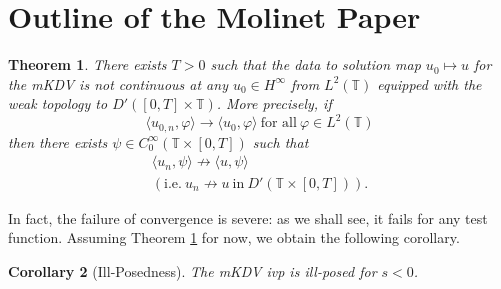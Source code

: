 \documentclass[12pt,reqno]{amsart}
\numberwithin{equation}{section}  %
\newcommand{\ci}{\mathbb{T}}
\newcommand{\vp}{\varphi}
\newtheorem{theorem}{Theorem}[section]
\newtheorem{corollary}[theorem]{Corollary}
\begin{document}
  \section{Outline of the Molinet Paper \cite{Molinet:2011uq}}
        \label{sec:outline}
        \begin{theorem}
          \label{thm:cont-fail}
        There exists $T > 0$ such that the data to solution map $u_{0} \mapsto u$ for
        the mKDV is not continuous at any $u_{0} \in H^{\infty}$ from $L^{2}(\ci)$
        equipped with the weak topology to $D'\left([0, T] \times \ci
        \right)$. More precisely, if 
        \begin{equation}
          \langle u_{0,n}, \vp \rangle  \to \langle u_{0}, \vp \rangle  \ 
          \text{for all} \ \vp \in L^{2}(\ci)
        \end{equation}
        then there exists $\psi \in C^{\infty}_{0}(\ci \times \left[ 0, T
        \right])$ such that
        \begin{gather*}
           \langle u_{n}, \psi \rangle  \not \to \langle u, \psi \rangle 
          \\
          (\text{i.e.} \ u_{n} \not \to u \ \text{in} \ D'\left( \ci \times [0,T]
          \right)).
        \end{gather*}
        \end{theorem}
    In fact, the failure of convergence is severe: as we shall see, it fails  
    for any test function.
    Assuming Theorem \ref{thm:cont-fail} for now, we obtain the following
    corollary.
    \begin{corollary}[Ill-Posedness]
   The mKDV ivp is ill-posed for $s < 0$.  
    \label{prop:ill-pos}
    \end{corollary}
\end{document}
